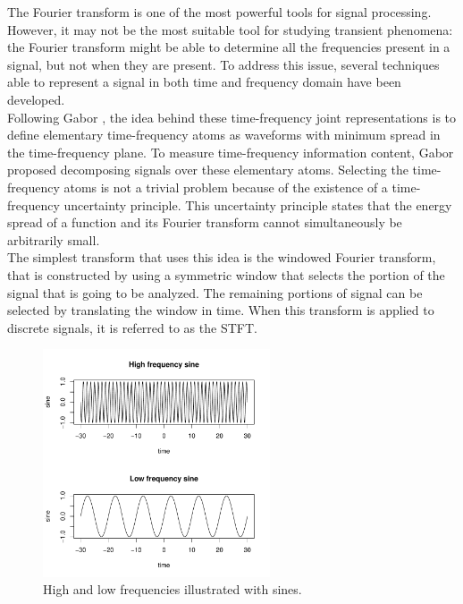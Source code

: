 \documentclass[12pt,lot, lof]{puthesis}
\begin{document}
The Fourier transform is one of the most powerful tools for signal processing. 
However, it may not be the most suitable tool for studying 
transient phenomena: the Fourier transform might be able to
determine all the frequencies present in a signal, but not when they are 
present. To address this issue, several techniques able to represent a signal 
in both time and frequency domain have been developed.\\

Following Gabor \cite{gabor1946}, the idea behind these time-frequency joint 
representations is to define elementary time-frequency atoms as
waveforms with minimum spread in the time-frequency plane. To measure 
time-frequency information content, Gabor proposed decomposing signals over 
these
elementary atoms. Selecting the time-frequency atoms is not a trivial problem 
because of the existence of a time-frequency uncertainty principle. This 
uncertainty principle states that the energy spread of a function and its 
Fourier transform  cannot  simultaneously be arbitrarily small.\\

The simplest transform that uses this idea is the windowed Fourier transform, 
that is  constructed by using a symmetric window that selects the portion of 
the signal that is going to be analyzed. The remaining portions of signal can 
be selected by translating the window in time. When this transform is applied 
to discrete signals, it is referred to as the \gls{STFT}.\\

\begin{figure}[h]
\centering
\includegraphics[width=0.6\textwidth]{figures/tutorial-highVslow}
\caption{High and low frequencies illustrated with sines.\label{fig:sines}}
\end{figure}
\end{document}
